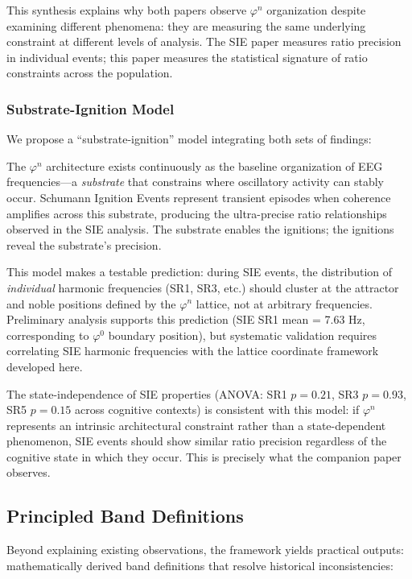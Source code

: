 \documentclass[11pt,a4paper]{article}
\newcommand{\phisym}{\varphi}
\begin{document}
This synthesis explains why both papers observe $\phisym^n$ organization despite examining different phenomena: they are measuring the same underlying constraint at different levels of analysis. The SIE paper measures ratio precision in individual events; this paper measures the statistical signature of ratio constraints across the population.

\subsubsection{Substrate-Ignition Model}

We propose a ``substrate-ignition'' model integrating both sets of findings:

\begin{keyinsight}
The $\phisym^n$ architecture exists continuously as the baseline organization of EEG frequencies---a \textit{substrate} that constrains where oscillatory activity can stably occur. Schumann Ignition Events represent transient episodes when coherence amplifies across this substrate, producing the ultra-precise ratio relationships observed in the SIE analysis. The substrate enables the ignitions; the ignitions reveal the substrate's precision.
\end{keyinsight}

This model makes a testable prediction: during SIE events, the distribution of \textit{individual} harmonic frequencies (SR1, SR3, etc.) should cluster at the attractor and noble positions defined by the $\phisym^n$ lattice, not at arbitrary frequencies. Preliminary analysis supports this prediction (SIE SR1 mean = 7.63 Hz, corresponding to $\phisym^0$ boundary position), but systematic validation requires correlating SIE harmonic frequencies with the lattice coordinate framework developed here.

The state-independence of SIE properties (ANOVA: SR1 $p = 0.21$, SR3 $p = 0.93$, SR5 $p = 0.15$ across cognitive contexts) is consistent with this model: if $\phisym^n$ represents an intrinsic architectural constraint rather than a state-dependent phenomenon, SIE events should show similar ratio precision regardless of the cognitive state in which they occur. This is precisely what the companion paper observes.

\subsection{Principled Band Definitions}

Beyond explaining existing observations, the framework yields practical outputs: mathematically derived band definitions that resolve historical inconsistencies:
\end{document}
